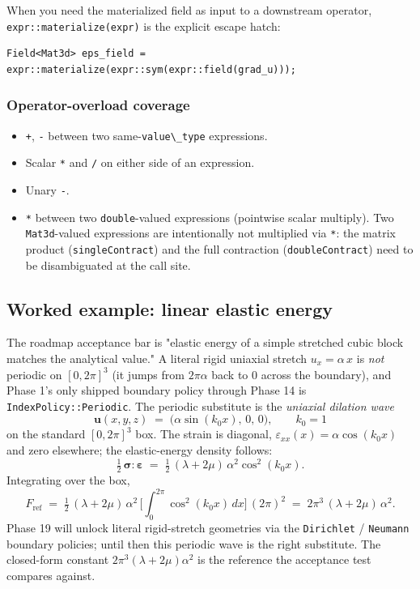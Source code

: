 When you need the materialized field as input to a downstream operator,
\passthrough{\lstinline!expr::materialize(expr)!} is the explicit
escape hatch:

\begin{verbatim}
Field<Mat3d> eps_field = expr::materialize(expr::sym(expr::field(grad_u)));
\end{verbatim}

\subsubsection{Operator-overload coverage}

\begin{itemize}
\tightlist
\item
  \texttt{+}, \texttt{-} between two same-\passthrough{\lstinline!value\_type!}
  expressions.
\item
  Scalar \texttt{*} and \texttt{/} on either side of an expression.
\item
  Unary \texttt{-}.
\item
  \texttt{*} between two \passthrough{\lstinline!double!}-valued
  expressions (pointwise scalar multiply). Two
  \passthrough{\lstinline!Mat3d!}-valued expressions are intentionally
  not multiplied via \texttt{*}: the matrix product
  (\passthrough{\lstinline!singleContract!}) and the full contraction
  (\passthrough{\lstinline!doubleContract!}) need to be disambiguated
  at the call site.
\end{itemize}

\subsection{Worked example: linear elastic energy}\label{phase15-elastic-energy}

The roadmap acceptance bar is "elastic energy of a simple stretched
cubic block matches the analytical value." A literal rigid uniaxial
stretch \(u_x = \alpha\,x\) is \emph{not} periodic on
\([0, 2\pi]^3\) (it jumps from \(2\pi\alpha\) back to \(0\) across the
boundary), and Phase 1's only shipped boundary policy through
Phase 14 is \passthrough{\lstinline!IndexPolicy::Periodic!}. The
periodic substitute is the \emph{uniaxial dilation wave}
\[
\mathbf u(x, y, z) \;=\; \big(\alpha\sin(k_0 x),\,0,\,0\big),\qquad k_0 = 1
\]
on the standard \([0, 2\pi]^3\) box. The strain is diagonal,
\(\varepsilon_{xx}(x) = \alpha\cos(k_0 x)\) and zero elsewhere; the
elastic-energy density follows:
\[
\tfrac12\,\boldsymbol{\sigma}:\boldsymbol{\varepsilon}
\;=\;
\tfrac12\,(\lambda + 2\mu)\,\alpha^2\cos^2(k_0 x).
\]
Integrating over the box,
\[
F_{\mathrm{ref}}
\;=\;
\tfrac12\,(\lambda + 2\mu)\,\alpha^2
\,\bigl[\textstyle\int_0^{2\pi}\!\cos^2(k_0 x)\,dx\bigr]\,(2\pi)^2
\;=\;
2\pi^3\,(\lambda + 2\mu)\,\alpha^2.
\]
Phase 19 will unlock literal rigid-stretch geometries via the
\passthrough{\lstinline!Dirichlet!} / \passthrough{\lstinline!Neumann!}
boundary policies; until then this periodic wave is the right
substitute. The closed-form constant
\(2\pi^3(\lambda + 2\mu)\alpha^2\) is the reference the acceptance
test compares against.


